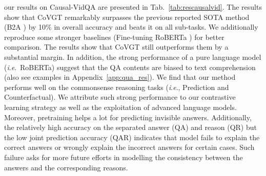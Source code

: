 \documentclass[10pt,journal,compsoc]{IEEEtran}
\newcommand{\ie}{\textit{i}.\textit{e}.}
\begin{document}
our results on Causal-VidQA \cite{li2022representation} are presented in Tab.~\ref{tab:rescausalvid}. The results show that CoVGT remarkably surpasses the previous reported SOTA method (B2A \cite{park2021bridge}) by 10\% in overall accuracy and beats it on all sub-tasks. We additionally reproduce some stronger baselines (Fine-tuning RoBERTa \cite{liu2019roberta}) for better comparison. The results show that CoVGT still outperforms them by a substantial margin. In addition, the strong performance of a pure language model (\ie~RoBERTa) suggest that the QA contents are biased to text comprehension (also see examples in Appendix~\ref{app:qua_res}). We find that our method performs well on the commonsense reasoning tasks (\ie, Prediction and Counterfactual). We attribute such strong performance to our contrastive learning strategy as well as the exploitation of advanced language models. Moreover, pretraining helps a lot for predicting invisible answers. Additionally, the relatively high accuracy on the separated answer (QA) and reason (QR) but the low joint prediction accuracy (QAR) indicates that model fails to explain the correct answers or wrongly explain the incorrect answers for certain cases. Such failure asks for more future efforts in modelling the consistency between the answers and the corresponding reasons. 
\setlength{\tabcolsep}{3pt}
\end{document}
